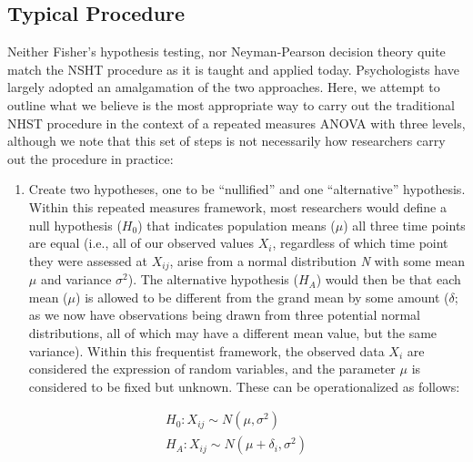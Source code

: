 \documentclass[,man, mask]{apa6}
\providecommand{\tightlist}{%
  \setlength{\itemsep}{0pt}\setlength{\parskip}{0pt}}
\theoremstyle{definition}
\theoremstyle{definition}
\theoremstyle{definition}
\theoremstyle{remark}
\begin{document}
\subsection{Typical Procedure}\label{typical-procedure}

Neither Fisher's hypothesis testing, nor Neyman-Pearson decision theory
quite match the NSHT procedure as it is taught and applied today.
Psychologists have largely adopted an amalgamation of the two
approaches. Here, we attempt to outline what we believe is the most
appropriate way to carry out the traditional NHST procedure in the
context of a repeated measures ANOVA with three levels, although we note
that this set of steps is not necessarily how researchers carry out the
procedure in practice:

\begin{enumerate}
\def\labelenumi{\arabic{enumi})}
\tightlist
\item
  Create two hypotheses, one to be \enquote{nullified} and one
  \enquote{alternative} hypothesis. Within this repeated measures
  framework, most researchers would define a null hypothesis (\(H_0\))
  that indicates population means (\(\mu\)) all three time points are
  equal (i.e., all of our observed values \(X_{i}\), regardless of which
  time point they were assessed at \(X_{ij}\), arise from a normal
  distribution \emph{N} with some mean \(\mu\) and variance
  \(\sigma^2\)). The alternative hypothesis (\(H_A\)) would then be that
  each mean (\(\mu\)) is allowed to be different from the grand mean by
  some amount (\(\delta\); as we now have observations being drawn from
  three potential normal distributions, all of which may have a
  different mean value, but the same variance). Within this frequentist
  framework, the observed data \(X_{i}\) are considered the expression
  of random variables, and the parameter \(\mu\) is considered to be
  fixed but unknown. These can be operationalized as follows:
\end{enumerate}

\[
\begin{aligned}
  H_0: X_{ij} \sim N(\mu, \sigma^2) \\
  H_A: X_{ij} \sim N(\mu + \delta_i, \sigma^2)
\end{aligned}
\]
\end{document}
